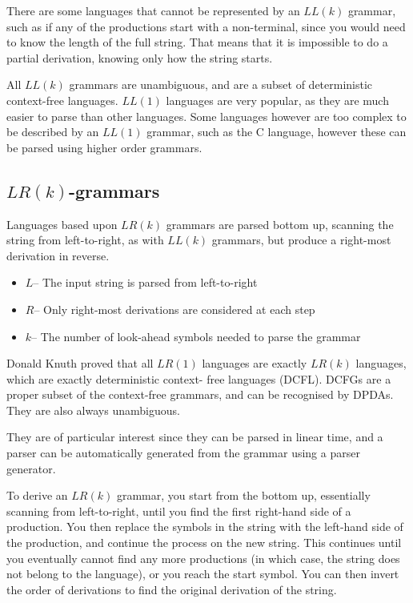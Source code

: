 There are some languages that cannot be represented by an $LL(k)$ grammar, such as if any of the productions start with
 a non-terminal, since you would need to know the length of the full string. That means that it is impossible to do a
 partial derivation, knowing only how the string starts.

All $LL(k)$ grammars are unambiguous, and are a subset of deterministic context-free languages. $LL(1)$ languages are
 very popular, as they are much easier to parse than other languages. Some languages however are too complex to be
 described by an $LL(1)$ grammar, such as the C language, however these can be parsed using higher order grammars.

\subsection*{$LR(k)$-grammars}

Languages based upon $LR(k)$ grammars are parsed bottom up, scanning the string from left-to-right, as with $LL(k)$
 grammars, but produce a right-most derivation in reverse.

\begin{itemize}
  \item $L$-- The input string is parsed from left-to-right
  \item $R$-- Only right-most derivations are considered at each step
  \item $k$-- The number of look-ahead symbols needed to parse the grammar
\end{itemize}

Donald Knuth proved that all $LR(1)$ languages are exactly $LR(k)$ languages, which are exactly deterministic context-
free languages (DCFL). DCFGs are a proper subset of the context-free grammars, and can be recognised by DPDAs. They are
 also always unambiguous.

They are of particular interest since they can be parsed in linear time, and a parser can be automatically generated
 from the grammar using a parser generator.

To derive an $LR(k)$ grammar, you start from the bottom up, essentially scanning from left-to-right, until you find the
 first right-hand side of a production. You then replace the symbols in the string with the left-hand side of the
 production, and continue the process on the new string. This continues until you eventually cannot find any more
 productions (in which case, the string does not belong to the language), or you reach the start symbol. You can then
 invert the order of derivations to find the original derivation of the string.
